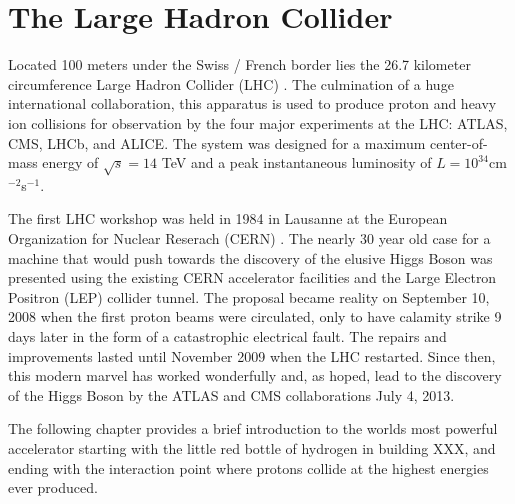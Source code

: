 \chapter{The Large Hadron Collider} \label{chap:lhc}

Located 100 meters under the Swiss / French border lies the 26.7 kilometer
circumference Large Hadron Collider (LHC) \cite{Evans:2008zzb}.  The
culmination of a huge international collaboration, this apparatus is used to
produce proton and heavy ion collisions for observation by the four major
experiments at the LHC: ATLAS, CMS, LHCb, and ALICE.  The system was designed
for a maximum center-of-mass  energy of $\sqrt{s} = 14$ TeV and a peak
instantaneous luminosity of $L = 10^{34} $cm$^{-2} $s$^{-1}$.  

The first LHC workshop was held in 1984 in Lausanne at the European
Organization for  Nuclear Reserach (CERN) \cite{LlewellynSmith:2014lmn}.  The
nearly 30 year old case for a machine that would push towards the discovery of
the elusive Higgs Boson was presented using the existing CERN accelerator
facilities and the Large Electron Positron (LEP) collider tunnel. The proposal
became reality on September 10, 2008 when the first proton beams were
circulated, only to have calamity strike 9 days later in the form of a
catastrophic electrical fault. The repairs and improvements lasted until
November 2009 when the LHC restarted.  Since then, this modern marvel has worked
wonderfully and, as hoped, lead to the discovery of the Higgs Boson by the ATLAS
and CMS collaborations July 4, 2013.

The following  chapter provides a brief introduction to the worlds most
powerful accelerator starting with the little red bottle of hydrogen in
building XXX, and ending with the interaction point where protons collide at
the highest energies ever produced.





